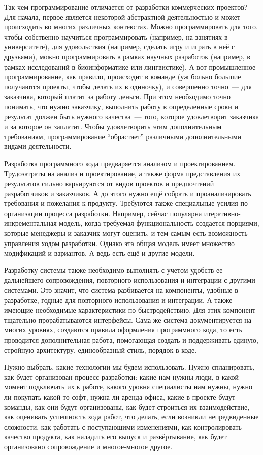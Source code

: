 \documentclass{../../text-style}
\begin{document}
Так чем программирование отличается от разработки коммерческих проектов? Для начала, первое является некоторой абстрактной деятельностью и может происходить во многих различных контекстах. Можно программировать для того, чтобы собственно научиться программировать (например, на занятиях в университете), для удовольствия (например, сделать игру и играть в неё с друзьями), можно программировать в рамках научных разработок (например, в рамках исследований в биоинформатике или лингвистике). А вот промышленное программирование, как правило, происходит в команде (уж больно большие получаются проекты, чтобы делать их в одиночку), и совершенно точно~--- для заказчика, который платит за работу деньги. При этом необходимо точно понимать, что нужно заказчику, выполнить работу в определенные сроки и результат должен быть нужного качества~--- того, которое удовлетворит заказчика и за которое он заплатит. Чтобы удовлетворить этим дополнительным требованиям, программирование \enquote{обрастает} различными дополнительными видами деятельности.

Разработка программного кода предваряется анализом и проектированием. Трудозатраты на анализ и проектирование, а также форма представления их результатов сильно варьируются от видов проектов и предпочтений разработчиков и заказчиков. А до этого нужно ещё собрать и проанализировать требования и пожелания к продукту. Требуются также специальные усилия по организации процесса разработки. Например, сейчас популярна итеративно-инкрементальная модель, когда требуемая функциональность создается порциями, которые менеджеры и заказчик могут оценить, и тем самым есть возможность управления ходом разработки. Однако эта общая модель имеет множество модификаций и вариантов. А ведь есть ещё и другие модели.

Разработку системы также необходимо выполнять с учетом удобств ее дальнейшего сопровождения, повторного использования и интеграции с другими системами. Это значит, что система разбивается на компоненты, удобные в разработке, годные для повторного использования и интеграции. А также имеющие необходимые характеристики по быстродействию. Для этих компонент тщательно прорабатываются интерфейсы. Сама же система документируется на многих уровнях, создаются правила оформления программного кода, то есть проводится дополнительная работа, помогающая создать и поддерживать единую, стройную архитектуру, единообразный стиль, порядок в коде.

Нужно выбрать, какие технологии мы будем использовать. Нужно спланировать, как будет организован процесс разработки: какие нам нужны люди, в какой момент подключать их к работе, какого уровня специалисты нам нужны, нужно ли покупать какой-то софт, нужна ли аренда офиса, какие в проекте будут команды, как они будут организованы, как будет строиться их взаимодействие, как оценивать успешность хода работ, что делать, если возникли непредвиденные сложности, как работать с поступающими изменениями, как контролировать качество продукта, как наладить его выпуск и развёртывание, как будет организовано сопровождение и многое-многое другое.
\end{document}
